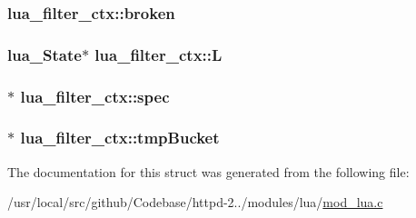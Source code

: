 \subsubsection[{\texorpdfstring{broken}{broken}}]{ lua\+\_\+filter\+\_\+ctx\+::broken}\hypertarget{structlua__filter__ctx_a011e7c5e2e101a31ff9ca32626bce653}{}\label{structlua__filter__ctx_a011e7c5e2e101a31ff9ca32626bce653}
\subsubsection[{\texorpdfstring{L}{L}}]{\setlength{\rightskip}{0pt plus 5cm}lua\+\_\+\+State$\ast$ lua\+\_\+filter\+\_\+ctx\+::L}\hypertarget{structlua__filter__ctx_ac60c8d100d063cc00acc3ab39c436301}{}\label{structlua__filter__ctx_ac60c8d100d063cc00acc3ab39c436301}
\subsubsection[{\texorpdfstring{spec}{spec}}]{$\ast$ lua\+\_\+filter\+\_\+ctx\+::spec}\hypertarget{structlua__filter__ctx_a8c89666aa33dd299464577e166f2c115}{}\label{structlua__filter__ctx_a8c89666aa33dd299464577e166f2c115}
\subsubsection[{\texorpdfstring{tmp\+Bucket}{tmpBucket}}]{$\ast$ lua\+\_\+filter\+\_\+ctx\+::tmp\+Bucket}\hypertarget{structlua__filter__ctx_a0cddc3ee7e26e721a1508197a3319aa0}{}\label{structlua__filter__ctx_a0cddc3ee7e26e721a1508197a3319aa0}


The documentation for this struct was generated from the following file\+:\begin{DoxyCompactItemize}
\item 
/usr/local/src/github/\+Codebase/httpd-\/2../modules/lua/\hyperlink{mod__lua_8c}{mod\+\_\+lua.\+c}\end{DoxyCompactItemize}
